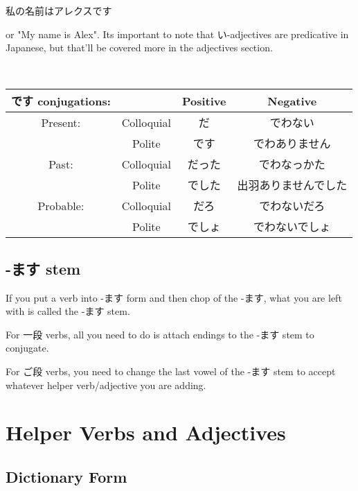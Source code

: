 \documentclass{article}
\begin{document}
\begin{CJK}{UTF8}{min}
\begin{example}
私の名前はアレクスです
\end{example}

or "My name is Alex". Its important to note that い-adjectives are predicative in Japanese, but that'll be covered more in the adjectives section.


\begin{example}
\ 



\begin{tabular}{| c | c || c | c |}
    です conjugations: & & Positive & Negative\\\hline\hline
    Present: & Colloquial & だ & でわない\\
    & Polite & です & でわありません\\
    Past: & Colloquial & だった & でわなっかた\\
    & Polite & でした & 出羽ありませんでした\\
    Probable: & Colloquial & だろ & でわないだろ\\
    & Polite & でしょ & でわないでしょ\\
\end{tabular}
\end{example}


\subsection{-ます stem}

If you put a verb into -ます form and then chop of the -ます, what you are left with is called the -ます stem. 

For 一段 verbs, all you need to do is attach endings to the -ます stem to conjugate.

For ご段 verbs, you need to change the last vowel of the -ます stem to accept whatever helper verb/adjective you are adding. 

\section{Helper Verbs and Adjectives}

\subsection{Dictionary Form}


\end{CJK}
\end{document}
